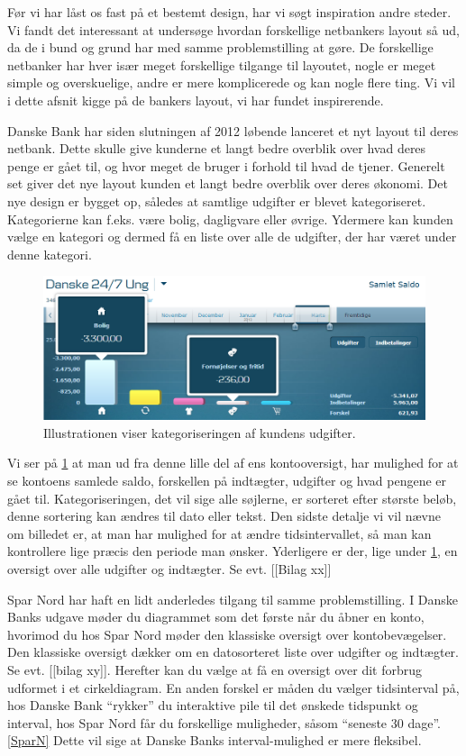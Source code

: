 Før vi har låst os fast på et bestemt design, har vi søgt inspiration andre steder. Vi fandt det interessant at undersøge hvordan forskellige netbankers layout så ud, da de i bund og grund har med samme problemstilling at gøre. De forskellige netbanker har hver især meget forskellige tilgange til layoutet, nogle er meget simple og overskuelige, andre er mere komplicerede og kan nogle flere ting. Vi vil i dette afsnit kigge på de bankers layout, vi har fundet inspirerende.

Danske Bank har siden slutningen af 2012 løbende lanceret et nyt layout til deres netbank\cite{Danskebank}. Dette skulle give kunderne et langt bedre overblik over hvad deres penge er gået til, og hvor meget de bruger i forhold til hvad de tjener. Generelt set giver det nye layout kunden et langt bedre overblik over deres økonomi. Det nye design er bygget op, således at samtlige udgifter er blevet kategoriseret. Kategorierne kan f.eks. være bolig, dagligvare eller øvrige. Ydermere kan kunden vælge en kategori og dermed få en liste over alle de udgifter, der har været under denne kategori. 

\begin{figure}[h!]
\centering
\includegraphics[width=1.0\textwidth]{Billeder/DanskeB.png}
\caption{ Illustrationen viser kategoriseringen af kundens udgifter.}
\label{DanskeB}
\end{figure}

Vi ser på \ref{DanskeB} at man ud fra denne lille del af ens kontooversigt, har mulighed for at se kontoens samlede saldo, forskellen på indtægter, udgifter og hvad pengene er gået til. Kategoriseringen, det vil sige alle søjlerne, er sorteret efter største beløb, denne sortering kan ændres til dato eller tekst. Den sidste detalje vi vil nævne om billedet er, at man har mulighed for at ændre tidsintervallet, så man kan kontrollere lige præcis den periode man ønsker. Yderligere er der, lige under \ref{DanskeB}, en oversigt over alle udgifter og indtægter. Se evt. [[Bilag xx]]

Spar Nord har haft en lidt anderledes tilgang til samme problemstilling. I Danske Banks udgave møder du diagrammet som det første når du åbner en konto, hvorimod du hos Spar Nord møder den klassiske oversigt over kontobevægelser. Den klassiske oversigt dækker om en datosorteret liste over udgifter og indtægter. Se evt. [[bilag xy]]. Herefter kan du vælge at få en oversigt over dit forbrug udformet i et cirkeldiagram. En anden forskel er måden du vælger tidsinterval på, hos Danske Bank “rykker” du interaktive pile til det ønskede tidspunkt og interval, hos Spar Nord får du forskellige muligheder, såsom “seneste 30 dage”. \ref{SparN} Dette vil sige at Danske Banks interval-mulighed er mere fleksibel.


